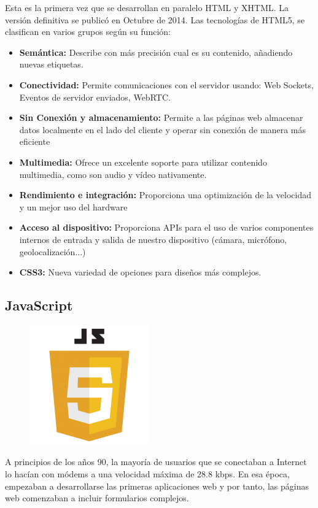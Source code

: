 \documentclass[a4paper, 12pt]{book}
\begin{document}
Esta es la primera vez que se desarrollan en paralelo HTML y XHTML. La versión definitiva se publicó en Octubre de 2014. Las tecnologías de HTML5, se clasifican en varios grupos según su función:
\begin{itemize}
\item \textbf{Semántica: }Describe con más precisión cual es su contenido, añadiendo nuevas etiquetas.
\item \textbf{Conectividad: }Permite comunicaciones con el servidor usando: Web Sockets, Eventos de servidor enviados, WebRTC.
\item \textbf{Sin Conexión y almacenamiento: }Permite a las páginas web almacenar datos localmente en el lado del cliente y operar sin conexión de manera más eficiente
\item \textbf{Multimedia: } Ofrece un excelente soporte para utilizar contenido multimedia, como son audio y vídeo nativamente.
\item \textbf{Rendimiento e integración: }Proporciona una optimización de la velocidad y un mejor uso del hardware
\item \textbf{Acceso al dispositivo: }Proporciona APIs para el uso de varios componentes internos de entrada y salida de nuestro dispositivo (cámara, micrófono, geolocalización...)
\item \textbf{CSS3: }Nueva variedad de opciones para diseños más complejos.
\end{itemize}

\subsection{JavaScript}
\begin{figure}[hbtp]
\centering
\includegraphics[scale=0.85]{img/js.png} 
\end{figure}
A principios de los años 90, la mayoría de usuarios que se conectaban a Internet lo hacían con módems a una velocidad máxima de 28.8 kbps. En esa época, empezaban a desarrollarse las primeras aplicaciones web y por tanto, las páginas web comenzaban a incluir formularios complejos.
\end{document}
